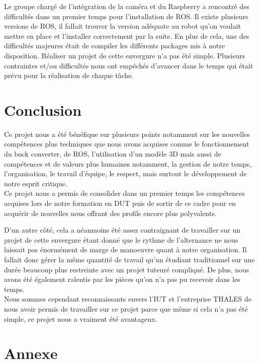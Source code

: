 \documentclass{PackagerQualityN}
\begin{document}
Le groupe chargé de l'intégration de la caméra et du Raspberry a rencontré des difficultés dans un premier temps pour l'installation de ROS. Il existe plusieurs versions de ROS, il fallait trouver la version adéquate au robot qu'on voulait mettre en place et l'installer correctement par la suite.
En plus de cela, une des difficultés majeures était de compiler les différents packages mis à notre disposition. Réaliser un projet de cette envergure n’a pas été simple. Plusieurs contraintes et/ou difficultés nous ont empêchés d’avancer dans le temps qui était prévu pour la réalisation de chaque tâche.\\


\newp
\section*{Conclusion}
Ce projet nous a été bénéfique sur plusieurs points notamment sur les nouvelles compétences plus techniques que nous avons acquises comme le fonctionnement du buck converter, de ROS, l'utilisation d'un modèle 3D mais aussi de compétences et de valeurs plus humaines notamment, la gestion de notre temps, l'organisation, le travail d'équipe, le respect, mais surtout le développement de notre esprit critique.\\

Ce projet nous a permis de consolider dans un premier temps les compétences acquises lors de notre formation en DUT puis de sortir de ce cadre pour en acquérir de nouvelles nous offrant des profils encore plus polyvalents.

D'un autre côté, cela a néanmoins été assez contraignant de travailler sur un projet de cette envergure étant donné que le rythme de l'alternance ne nous laissait pas énormément de marge de manoeuvre quant à notre organisation. Il fallait donc gérer la même quantité de travail qu'un étudiant traditionnel sur une durée beaucoup plus restreinte avec un projet tuteuré compliqué.
De plus, nous avons été également ralentis par les pièces qu'on n’a pas pu recevoir dans les temps.\\

Nous sommes cependant reconnaissants envers l'IUT et l'entreprise THALES de nous avoir permis de travailler sur ce projet parce que même si cela n'a pas été simple, ce projet nous a vraiment été avantageux.\\


\newp
\section*{Annexe}
\end{document}
